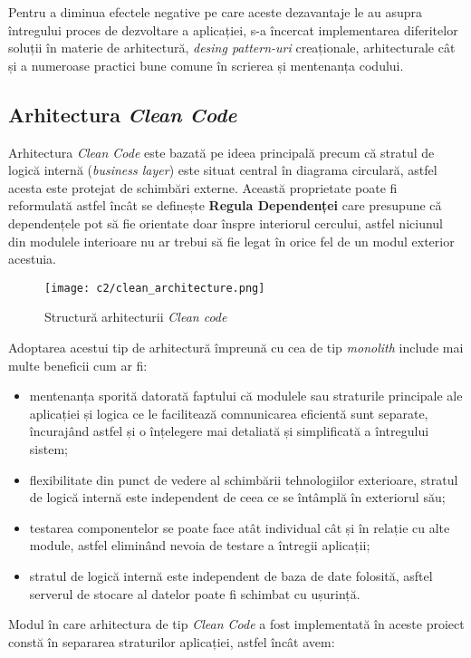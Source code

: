 Pentru a diminua efectele negative pe care aceste dezavantaje le au asupra întregului proces de dezvoltare a aplicației, s-a încercat implementarea diferitelor soluții în materie de arhitectură,  \textit{desing pattern-uri} creaționale, arhitecturale cât și a numeroase practici bune comune în scrierea și mentenanța codului.

\subsection*{Arhitectura \textit{Clean Code}}
Arhitectura \textit{Clean Code } este bazată pe ideea principală precum că stratul de logică internă (\textit{business layer}) este situat central în diagrama circulară, astfel acesta este protejat de schimbări externe. Această proprietate poate fi reformulată astfel încât se definește \textbf{Regula Dependenței} care presupune că dependențele pot să fie orientate doar înspre interiorul cercului, astfel niciunul din modulele interioare nu ar trebui să fie legat în orice fel de un modul exterior acestuia.

\begin{figure}[h]
	\centering
	
	\texttt{[image: c2/clean\_architecture.png]}
	\caption{Structură arhitecturii \textit{Clean code}}
\end{figure}

Adoptarea acestui tip de arhitectură împreună cu cea de tip \textit{monolith} include mai multe beneficii cum ar fi:

\begin{itemize}

	\item mentenanța sporită datorată faptului că modulele sau straturile principale ale aplicației și logica ce le facilitează comnunicarea eficientă sunt separate, încurajând astfel și o înțelegere mai detaliată și simplificată a întregului sistem;
	
	\item flexibilitate din punct de vedere al schimbării tehnologiilor exterioare, stratul de logică internă este independent de ceea ce se întâmplă în exteriorul său;
	
	\item testarea componentelor se poate face atât individual cât și în relație cu alte module, astfel eliminând nevoia de testare a întregii aplicații;
	
	\item stratul de logică internă este independent de baza de date folosită, asftel serverul de stocare al datelor poate fi schimbat cu ușurință.

\end{itemize} 
Modul în care arhitectura de tip \textit{Clean Code} a fost implementată în aceste proiect constă în separarea straturilor aplicației, astfel încât avem:


